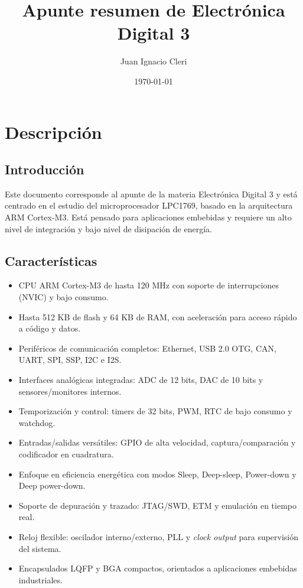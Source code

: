 ﻿\documentclass[11pt]{article}
\title{Apunte resumen de Electrónica Digital 3}
\author{Juan Ignacio Cleri}
\date{\today}
\begin{document}
\maketitle
\tableofcontents

\section{Descripción}
\subsection{Introducción}
Este documento corresponde al apunte de la materia Electrónica Digital 3 y está centrado en el estudio del microprocesador LPC1769, basado en la arquitectura ARM Cortex-M3. Está pensado para aplicaciones embebidas y requiere un alto nivel de integración y bajo nivel de disipación de energía.

\subsection{Características}
\begin{itemize}
  \item CPU ARM Cortex-M3 de hasta 120 MHz con soporte de interrupciones (NVIC) y bajo consumo.
  \item Hasta 512 KB de flash y 64 KB de RAM, con aceleración para acceso rápido a código y datos.
  \item Periféricos de comunicación completos: Ethernet, USB 2.0 OTG, CAN, UART, SPI, SSP, I2C e I2S.
  \item Interfaces analógicas integradas: ADC de 12 bits, DAC de 10 bits y sensores/monitores internos.
  \item Temporización y control: timers de 32 bits, PWM, RTC de bajo consumo y watchdog.
  \item Entradas/salidas versátiles: GPIO de alta velocidad, captura/comparación y codificador en cuadratura.
  \item Enfoque en eficiencia energética con modos Sleep, Deep-sleep, Power-down y Deep power-down.
  \item Soporte de depuración y trazado: JTAG/SWD, ETM y emulación en tiempo real.
  \item Reloj flexible: oscilador interno/externo, PLL y \textit{clock output} para supervisión del sistema.
  \item Encapsulados LQFP y BGA compactos, orientados a aplicaciones embebidas industriales.
\end{itemize}
\end{document}
